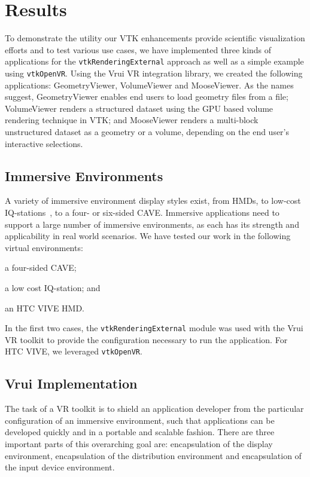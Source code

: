 \section{Results}

To demonstrate the utility our VTK enhancements provide scientific
visualization efforts and to test various use cases, we have implemented three kinds of
applications for the \texttt{vtkRenderingExternal} approach as well as
a simple example using \texttt{vtkOpenVR}.
Using the Vrui VR integration library, we created the following applications:
GeometryViewer, VolumeViewer and MooseViewer.
As the names suggest, GeometryViewer enables end users to load geometry files from a file; VolumeViewer renders a structured dataset using the GPU based volume rendering technique in VTK; and MooseViewer renders a multi-block unstructured dataset as a geometry or a volume, depending on the end user's interactive selections.

\subsection{Immersive Environments}

A variety of immersive environment display styles exist, from HMDs, to low-cost IQ-stations~\cite{Sherman:2010}, to a four- or six-sided CAVE\texttrademark. Immersive applications need to support a large number of immersive environments, as each has its strength and applicability in real world scenarios. We have tested our work in the following virtual environments: 

\begin{compactitem}
\item a four-sided CAVE\texttrademark;
\item a low cost IQ-station; and 
\item an HTC VIVE HMD.
\end{compactitem}

In the first two cases, the \texttt{vtkRenderingExternal} module was used with the Vrui VR toolkit to provide the configuration necessary to run the application. For HTC VIVE, we leveraged \texttt{vtkOpenVR}. 

\subsection{Vrui Implementation}

The task of a VR toolkit is to shield an application developer from the particular configuration of an immersive environment, such that applications can be developed quickly and in a portable and scalable fashion. There are three important parts of this overarching goal are: encapsulation of the display environment, encapsulation of the distribution environment and encapsulation of the input device environment.

